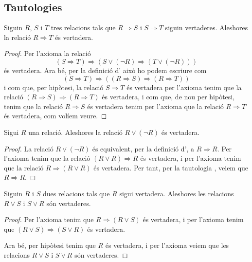 \documentclass[../Apunts.tex]{subfiles}
\begin{document}
	\subsection{Tautologies}
	\begin{tautology}
		\label{taut:transitivitat implicacions}
		Siguin \(R\), \(S\) i \(T\) tres relacions tals que \(R\Rightarrow S\) i \(S\Rightarrow T\) siguin vertaderes. Aleshores la relació \(R\Rightarrow T\) és vertadera.
		\begin{proof}
			Per l'axioma  la relació
			\[(S\Rightarrow T)\Rightarrow(S\lor(\lnot R)\Rightarrow(T\lor(\lnot R)))\]
			és vertadera. Ara bé, per la definició d' això ho podem escriure com
			\[(S\Rightarrow T)\Rightarrow((R\Rightarrow S)\Rightarrow(R\Rightarrow T))\]
			i com que, per hipòtesi, la relació \(S\Rightarrow T\) és vertadera per l'axioma  tenim que la relació \((R\Rightarrow S)\Rightarrow(R\Rightarrow T)\) és vertadera, i com que, de nou per hipòtesi, tenim que la relació \(R\Rightarrow S\) és vertadera tenim per l'axioma  que la relació \(R\Rightarrow T\) és vertadera, com volíem veure.
		\end{proof}
	\end{tautology}
	\begin{tautology}
		\label{taut:R o no R és vertadera}\label{taut:tercer exclòs}
		Sigui \(R\) una relació. Aleshores la relació \(R\lor(\lnot R)\) és vertadera.
		\begin{proof}
			La relació \(R\lor(\lnot R)\) és equivalent, per la definició d', a \(R\Rightarrow R\). Per l'axioma  tenim que la relació \((R\lor R)\Rightarrow R\) és vertadera, i per l'axioma  tenim que la relació \(R\Rightarrow(R\lor R)\) és vertadera. Per tant, per la tautologia , veiem que \(R\Rightarrow R\).
		\end{proof}
	\end{tautology}
	\begin{tautology}
		\label{taut:disjunció és vertadera si una de les relaciones és vertadera}
		Siguin \(R\) i \(S\) dues relacions tals que \(R\) sigui vertadera. Aleshores les relacions \(R\lor S\) i \(S\lor R\) són vertaderes.
		\begin{proof}
			Per l'axioma  tenim que \(R\Rightarrow(R\lor S)\) és vertadera, i per l'axioma  tenim que \((R\lor S)\Rightarrow(S\lor R)\) és vertadera.
			
			Ara bé, per hipòtesi tenim que \(R\) és vertadera, i per l'axioma  veiem que les relacions \(R\lor S\) i \(S\lor R\) són vertaderes.
		\end{proof}
	\end{tautology}
\end{document}
